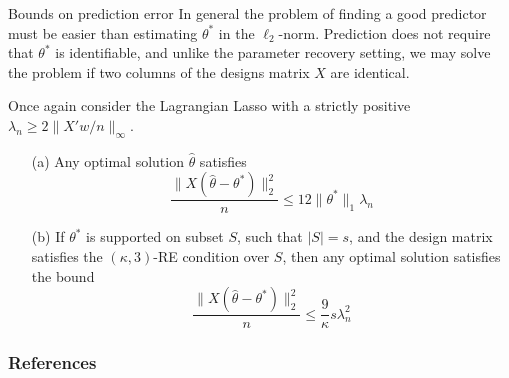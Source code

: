 \documentclass[10pt,handout,english]{beamer}
\begin{document}
\begin{frame}[allowframebreaks]{Bounds on prediction error}
In general the problem of finding a good predictor must be easier than estimating $\theta^*$ in the $\ell_2$-norm. Prediction does not require that $\theta^*$ is identifiable, and unlike the parameter recovery setting, we may solve the problem if two columns of the designs matrix $X$ are identical.
\begin{theorem}
Once again consider the Lagrangian Lasso with a strictly positive $\lambda_n\geq 2\lVert X'w/n\rVert_{\infty}$.
\begin{itemize}
\item[(a)] Any optimal solution $\hat{\theta}$ satisfies
\[
\frac{\lVert X(\hat{\theta}-\theta^*)\rVert_2^2}{n}\leq 12\lVert \theta^*\rVert_1\lambda_n
\]
\item[(b)] If $\theta^*$ is supported on subset $S$, such that $\lvert S\rvert=s$, and the design matrix satisfies the $(\kappa, 3)$-RE condition over $S$, then any optimal solution satisfies the bound
\[
\frac{\lVert X(\hat{\theta}-\theta^*)\rVert_2^2}{n}\leq \frac{9}{\kappa}s\lambda_n^2
\]
\end{itemize}
\end{theorem}
\end{frame}

\begin{frame}[allowframebreaks]
\frametitle{References}


\end{frame}
\end{document}
